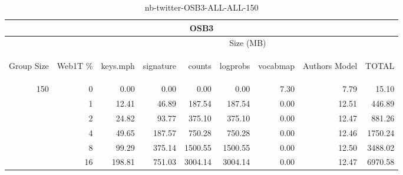 \begin{center}
\begin{table}[htbp] 
 \begin{center}
\begin{tabular}{ | r | r | r | r | r | r | r | r | r |}
\hline
\multicolumn{9}{|c|}{OSB3}\\
\hline
 & & \multicolumn{7}{|c|}{Size (MB)}\\ \cline{3-9}
\begin{sideways}Group Size\end{sideways} & \begin{sideways}Web1T \% \end{sideways} & \begin{sideways}keys.mph\end{sideways} & \begin{sideways}signature\end{sideways} & \begin{sideways}counts\end{sideways} & \begin{sideways}logprobs\end{sideways} & \begin{sideways}vocabmap\end{sideways} & \begin{sideways}Authors Model \end{sideways} & \begin{sideways}TOTAL\end{sideways}\\
\hline
\multirow{5}{*}{150}
 & 0 & 0.00 & 0.00 & 0.00 & 0.00 & 7.30 & 7.79 & 15.10\\ \cline{2-9}
 & 1 & 12.41 & 46.89 & 187.54 & 187.54 & 0.00 & 12.51 & 446.89\\ \cline{2-9}
 & 2 & 24.82 & 93.77 & 375.10 & 375.10 & 0.00 & 12.47 & 881.26\\ \cline{2-9}
 & 4 & 49.65 & 187.57 & 750.28 & 750.28 & 0.00 & 12.46 & 1750.24\\ \cline{2-9}
 & 8 & 99.29 & 375.14 & 1500.55 & 1500.55 & 0.00 & 12.50 & 3488.02\\ \cline{2-9}
 & 16 & 198.81 & 751.03 & 3004.14 & 3004.14 & 0.00 & 12.47 & 6970.58\\ \cline{2-9}
\hline
\end{tabular}
\caption{nb-twitter-OSB3-ALL-ALL-150}
\label{table:nb-twitter-OSB3-ALL-ALL-150}
\end{center}
 \end{table}
\end{center}

